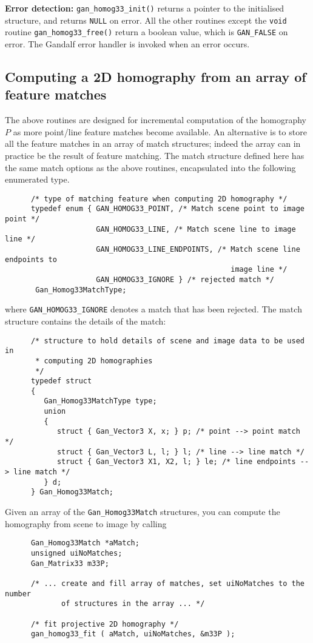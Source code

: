 {\bf Error detection:} {\tt gan\_homog33\_init()} returns a pointer to
the initialised structure, and returns {\tt NULL} on error.
All the other routines except the {\tt void} routine {\tt gan\_homog33\_free()}
return a boolean value, which is {\tt GAN\_FALSE} on error.
The Gandalf error handler is invoked when an error occurs.

\subsection{Computing a 2D homography from an array of feature matches}
The above routines are designed for incremental computation of the homography
$P$ as more point/line feature matches become available. An alternative is
to store all the feature matches in an array of match structures;
indeed the array can in practice be the result of feature matching.
The match structure defined here has the same match options as the above
routines, encapsulated into the following enumerated type.
\begin{verbatim}
      /* type of matching feature when computing 2D homography */
      typedef enum { GAN_HOMOG33_POINT, /* Match scene point to image point */
                     GAN_HOMOG33_LINE, /* Match scene line to image line */
                     GAN_HOMOG33_LINE_ENDPOINTS, /* Match scene line endpoints to
                                                    image line */
                     GAN_HOMOG33_IGNORE } /* rejected match */
       Gan_Homog33MatchType;
\end{verbatim}
where {\tt GAN\_HOMOG33\_IGNORE} denotes a match that has been rejected.
The match structure contains the details of the match:
\begin{verbatim}
      /* structure to hold details of scene and image data to be used in
       * computing 2D homographies
       */
      typedef struct
      {
         Gan_Homog33MatchType type;
         union
         {
            struct { Gan_Vector3 X, x; } p; /* point --> point match */
            struct { Gan_Vector3 L, l; } l; /* line --> line match */
            struct { Gan_Vector3 X1, X2, l; } le; /* line endpoints --> line match */
         } d;
      } Gan_Homog33Match;
\end{verbatim}
Given an array of the {\tt Gan\_Homog33Match} structures, you can compute
the homography from scene to image by calling
\begin{verbatim}
      Gan_Homog33Match *aMatch;
      unsigned uiNoMatches;
      Gan_Matrix33 m33P;

      /* ... create and fill array of matches, set uiNoMatches to the number
             of structures in the array ... */

      /* fit projective 2D homography */
      gan_homog33_fit ( aMatch, uiNoMatches, &m33P );
\end{verbatim}


